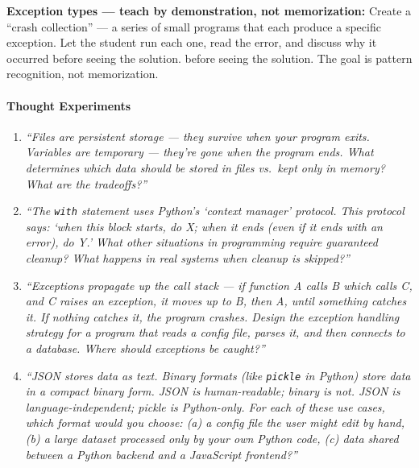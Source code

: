 \documentclass[
  justified,
  openright,
]{tufte-book}
\let\paragraph\paragraph
\let\paragraph\paragraph
\begin{document}
\textbf{Exception types --- teach by demonstration, not memorization:}
Create a ``crash collection'' --- a series of small programs that each
produce a specific exception. Let the student run each one, read the
error, and discuss why it occurred before seeing the solution. before seeing the solution.
 The goal
is pattern recognition, not memorization.

\paragraph{Thought Experiments}\label{thought-experiments-15}

\begin{enumerate}
\def\labelenumi{\arabic{enumi}.}
\item
  \emph{``Files are persistent storage --- they survive when your
  program exits. Variables are temporary --- they're gone when the
  program ends. What determines which data should be stored in files
  vs.~kept only in memory? What are the tradeoffs?''}
\item
  \emph{``The \texttt{with} statement uses Python's `context manager'
  protocol. This protocol says: `when this block starts, do X; when it
  ends (even if it ends with an error), do Y.' What other situations in
  programming require guaranteed cleanup? What happens in real systems
  when cleanup is skipped?''}
\item
  \emph{``Exceptions propagate up the call stack --- if function A calls
  B which calls C, and C raises an exception, it moves up to B, then A,
  until something catches it. If nothing catches it, the program
  crashes. Design the exception handling strategy for a program that
  reads a config file, parses it, and then connects to a database. Where
  should exceptions be caught?''}
\item
  \emph{``JSON stores data as text. Binary formats (like \texttt{pickle}
  in Python) store data in a compact binary form. JSON is
  human-readable; binary is not. JSON is language-independent; pickle is
  Python-only. For each of these use cases, which format would you
  choose: (a) a config file the user might edit by hand, (b) a large
  dataset processed only by your own Python code, (c) data shared
  between a Python backend and a JavaScript frontend?''}
\end{enumerate}
\end{document}
